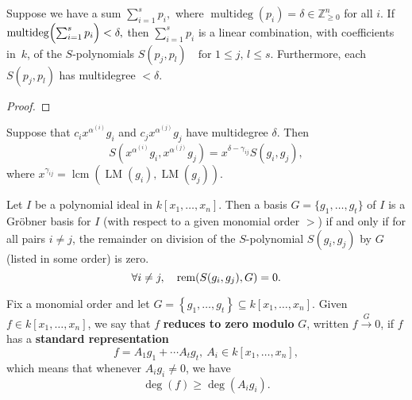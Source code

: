 \begin{lemma}\label{lem:Spolynomial_syzygy_of_degree_cancellation} %
    \leanok %
    Suppose we have a sum $\sum_{i=1}^s p_i,$ where $\operatorname{multideg}(p_i)=\delta\in\mathbb Z_{\ge0}^n$ for all $i$.
    If $\operatorname{multideg}\Bigl(\sum_{i=1}^s p_i\Bigr)<\delta,$ then $\sum_{i=1}^s p_i$ is a linear combination, with coefficients in~$k$, of the $S$-polynomials $S(p_j,p_l)\quad\text{for }1\le j,\,l\le s$.
    Furthermore, each $S(p_j,p_l)$ has multidegree $<\delta$.
\end{lemma}
\begin{proof}
  \leanok %
\end{proof}

\begin{lemma}\label{lem:S-polynomials_and_Monomial_Multiplication} %
  \leanok %
  Suppose that $c_i x^{\alpha^{(i)}} g_i$ and $c_j x^{\alpha^{(j)}} g_j$ have multidegree $\delta$. Then
  \[
  S(x^{\alpha^{(i)}} g_i, x^{\alpha^{(j)}} g_j) = x^{\delta - \gamma_{ij}} S(g_i, g_j),
  \]
  where $x^{\gamma_{ij}} = \operatorname{lcm}(\operatorname{LM}(g_i), \operatorname{LM}(g_j))$.
\end{lemma}

\begin{theorem}[Buchberger's Criterion] %
    \label{thm:Buchberger’s_Criterion} 
    \leanok %
    Let $I$ be a polynomial ideal in $k[x_1, \dots, x_n]$. 
    Then a basis $G = \{g_1, \dots , g_t\}$ of $I$ is a Gr{\"o}bner basis for $I$ (with respect to a given monomial order $>$)
    if and only if for all pairs $i \neq j$, the remainder on division of the $S$-polynomial $S(g_i, g_j)$ by $G$ (listed in some order) is zero.
    \[ \forall i \neq j, \quad \operatorname{rem}(S(g_i, g_j), G) = 0. \]
\end{theorem}

\begin{definition}\label{def:reduces_to_zero} %
    Fix a monomial order and let $G = \left\{g_1, \ldots , g_t\right\} \subseteq k[x_1, \ldots , x_n]$.
    Given $f \in k[x_1, \ldots , x_n]$, we say that $f$ \textbf{reduces to zero modulo} $G$, written $f \xrightarrow{G} 0$,
    if $f$ has a \textbf{standard representation}
    \[ f = A_1g_1 + \cdots A_tg_t,\ A_i \in k[x_1, \ldots , x_n],\]
    which means that whenever $A_ig_i \neq 0$, we have
    \[\operatorname{deg}(f) \geq \operatorname{deg}(A_ig_i).\]
\end{definition}

